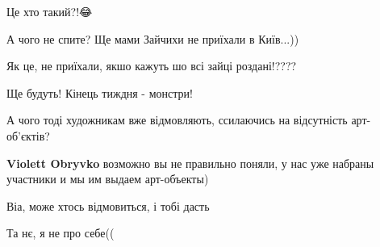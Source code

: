 
 
 
 
 

\qqSecCmt


Це хто такий?!😂🧐


А чого не спите? Ще мами Зайчихи не приїхали в Київ...))

\begin{itemize} %

Як це, не приїхали, якшо кажуть шо всі зайці роздані!???? 🤔
\end{itemize} %


Ще будуть! Кінець тиждня - монстри!

\begin{itemize} %

А чого тоді художникам вже відмовляють, ссилаючись на відсутність арт-об'єктів? 🤔

\textbf{Violett Obryvko} возможно вы не правильно поняли, у нас уже набраны участники и мы им выдаем арт-объекты)
\end{itemize} %


Віа, може хтось відмовиться, і тобі дасть

\begin{itemize} %

Та нє, я не про себе((
\end{itemize} %
